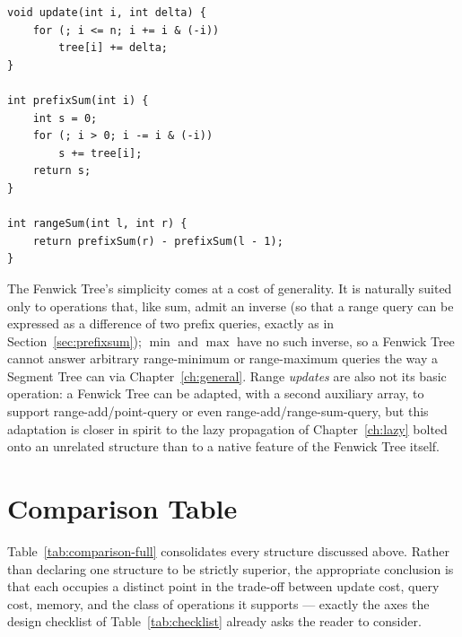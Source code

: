 \documentclass[
  11pt,
  a4paper,
  twoside=false,
  numbers=noenddot,
  headings=big,
  parskip=half,
  toc=bibliography,
  toc=listof,
  bibliography=totoc
]{scrreprt}
\begin{document}
\begin{table}[H]
\centering
\caption{Point update and range-sum query implemented on a Fenwick Tree; \texttt{tree} is 1-indexed and initialized to all zeros.}
\label{lst:fenwick-ref}
\begin{lstlisting}[style=cpp]
void update(int i, int delta) {
    for (; i <= n; i += i & (-i))
        tree[i] += delta;
}

int prefixSum(int i) {
    int s = 0;
    for (; i > 0; i -= i & (-i))
        s += tree[i];
    return s;
}

int rangeSum(int l, int r) {
    return prefixSum(r) - prefixSum(l - 1);
}
\end{lstlisting}
\end{table}

The Fenwick Tree's simplicity comes at a cost of generality. It is naturally suited only to operations that, like sum, admit an inverse (so that a range query can be expressed as a difference of two prefix queries, exactly as in Section~\ref{sec:prefixsum}); $\min$ and $\max$ have no such inverse, so a Fenwick Tree cannot answer arbitrary range-minimum or range-maximum queries the way a Segment Tree can via Chapter~\ref{ch:general}. Range \emph{updates} are also not its basic operation: a Fenwick Tree can be adapted, with a second auxiliary array, to support range-add/point-query or even range-add/range-sum-query, but this adaptation is closer in spirit to the lazy propagation of Chapter~\ref{ch:lazy} bolted onto an unrelated structure than to a native feature of the Fenwick Tree itself.

\section{Comparison Table}
Table~\ref{tab:comparison-full} consolidates every structure discussed above. Rather than declaring one structure to be strictly superior, the appropriate conclusion is that each occupies a distinct point in the trade-off between update cost, query cost, memory, and the class of operations it supports --- exactly the axes the design checklist of Table~\ref{tab:checklist} already asks the reader to consider.
\end{document}
